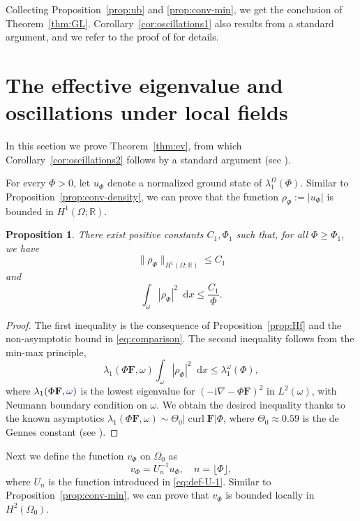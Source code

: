 \documentclass[11pt]{amsart}
\DeclareMathOperator{\curl}{curl}
\newcommand{\R}{\mathbb R}
\newcommand{\Fb}{\mathbf F}
\newcommand{\dd}{\mathop{}\!{\mathrm d}}
\newcommand{\ii}{\mathrm i}
\newcommand{\Bl}{\color{blue}}
\newtheorem{proposition}[theorem]{Proposition}
\theoremstyle{definition}
\numberwithin{equation}{section}
\begin{document}
Collecting Proposition~\ref{prop:ub} and \ref{prop:conv-min}, we get the conclusion of Theorem~\ref{thm:GL}. Corollary~\ref{cor:oscillations1} also results from a standard argument, and we refer to the proof of \cite[Corollary~1.5]{KP} for details.


\section{The effective eigenvalue and oscillations under local fields}
\label{sec:eigenvalueapproximation}

In this section we prove Theorem~\ref{thm:ev}, from which Corollary~\ref{cor:oscillations2} follows by a standard argument (see \cite[Proof of Thm.~1.7(2)]{KP}).

For every $\Phi>0$, let $u_\Phi$ denote a normalized ground state of $\lambda_1^\Omega(\Phi)$.
Similar to Proposition~\ref{prop:conv-density}, we can prove that the function $\rho_\Phi:=|u_\Phi|$ is bounded in $H^1(\Omega;\R)$.
%
\begin{proposition}\label{prop:con-gs}
There exist positive  constants $C_1,\Phi_1$ such that, for all $\Phi\geq \Phi_1$, we have
\[\|\rho_\Phi\|_{H^1(\Omega;\R)}\leq C_1\]
and
\[\int_{\omega}|\rho_\Phi|^2\dd x\leq \frac{C_1}{\Phi}.\]
\end{proposition}
\begin{proof}
The first inequality is the consequence of Proposition~\ref{prop:Hf} and the non-asymptotic bound in \eqref{eq:comparison}. The second inequality follows from the min-max principle,
\[ \lambda_1(\Phi\Fb,\omega)\int_\omega|\rho_\Phi|^2\dd x\leq \lambda_1^\omega(\Phi), \]
where $\lambda_1(\Phi\Fb,{\Bl \omega})$ is the lowest eigenvalue for $(-\ii\nabla-\Phi\Fb)^2$ in $L^2(\omega)$, with Neumann boundary condition on $\omega$. We obtain the desired inequality thanks to the known asymptotics  $\lambda_1(\Phi\Fb,\omega)\sim\Theta_0 |\curl\Fb|\Phi$, where $\Theta_0\approx 0.59$ is the de\,Gennes constant (see \cite[Thm.~8.1.1]{FH-b}).
\end{proof}


Next we define the function  $v_\Phi$ on $\Omega_0$ as
\[v_\Phi=U_n^{-1}u_{\Phi},\quad n=\lfloor \Phi\rfloor,\]
where $U_n$ is the function introduced in \eqref{eq:def-U-1}. Similar to Proposition~\ref{prop:conv-min}, we can prove that $v_\Phi$ is bounded locally in $H^2(\Omega_0)$.
\end{document}
